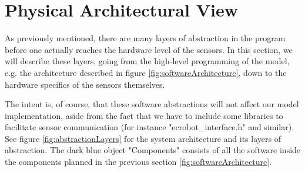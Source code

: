 \section{Physical Architectural View}


As previously mentioned, there are many layers of abstraction in the program before one actually reaches the hardware level of the sensors. In this section, we will describe these layers, going from the high-level programming of the model, e.g. the architecture described in figure \ref{fig:softwareArchitecture}, down to the hardware specifics of the sensors themselves. 

The intent is, of course, that these software abstractions will not affect our model implementation, aside from the fact that we have to include some libraries to facilitate sensor communication (for instance "ecrobot\_interface.h" and similar). See figure \ref{fig:abstractionLayers} for the system architecture and its layers of abstraction. The dark blue object "Components" consists of all the software inside the components planned in the previous section \ref{fig:softwareArchitecture}. 

